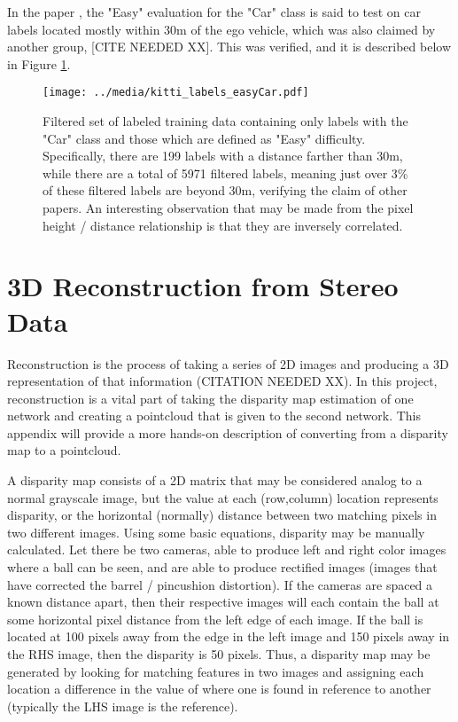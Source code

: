 In the paper \cite{wang_pseudo-lidar_2019}, the "Easy" evaluation for the "Car" class is said to test on car labels located mostly within 30m of the ego vehicle, which was also claimed by another group, [CITE NEEDED XX]. This was verified, and it is described below in Figure \ref{kitti_labels_easyCar}. 

\begin{figure}[h] %
	\centering
	\texttt{[image: ../media/kitti\_labels\_easyCar.pdf]}
	\caption{Filtered set of labeled training data containing only labels with the "Car" class and those which are defined as "Easy" difficulty. Specifically, there are 199 labels with a distance farther than 30m, while there are a total of 5971 filtered labels, meaning just over 3\% of these filtered labels are beyond 30m, verifying the claim of other papers. An interesting observation that may be made from the pixel height / distance relationship is that they are inversely correlated.}
	\label{kitti_labels_easyCar} %
\end{figure}


\newpage
\section{3D Reconstruction from Stereo Data}
\label{appendix_reconstruct}
Reconstruction is the process of taking a series of 2D images and producing a 3D representation of that information (CITATION NEEDED XX). In this project, reconstruction is a vital part of taking the disparity map estimation of one network and creating a pointcloud that is given to the second network. This appendix will provide a more hands-on description of converting from a disparity map to a pointcloud. 

A disparity map consists of a 2D matrix that may be considered analog to a normal grayscale image, but the value at each (row,column) location represents disparity, or the horizontal (normally) distance between two matching pixels in two different images. Using some basic equations, disparity may be manually calculated. Let there be two cameras, able to produce left and right color images where a ball can be seen, and are able to produce rectified images (images that have corrected the barrel / pincushion distortion). If the cameras are spaced a known distance apart, then their respective images will each contain the ball at some horizontal pixel distance from the left edge of each image. If the ball is located at 100 pixels away from the edge in the left image and 150 pixels away in the RHS image, then the disparity is 50 pixels. Thus, a disparity map may be generated by looking for matching features in two images and assigning each location a difference in the value of where one is found in reference to another (typically the LHS image is the reference).

